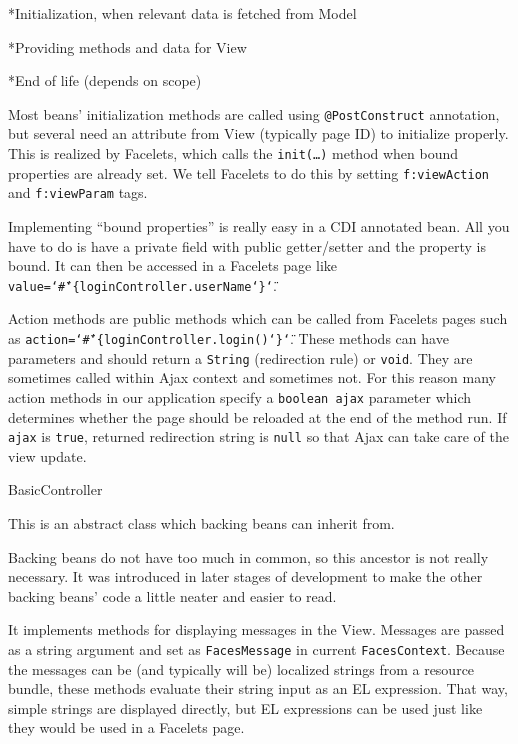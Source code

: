\begitems

*Initialization, when relevant data is fetched from Model

*Providing methods and data for View

*End of life (depends on scope)

\enditems

Most beans’ initialization methods are called using {\tt @PostConstruct} annotation, but several need an attribute from View (typically page ID) to initialize properly. This is realized by Facelets, which calls the {\tt init(…)} method when bound properties are already set. We tell Facelets to do this by setting {\tt f:viewAction} and {\tt f:viewParam} tags.

Implementing “bound properties” is really easy in a CDI annotated bean. All you have to do is have a private field with public getter/setter and the property is bound. It can then be accessed in a Facelets page like {\tt value=\char`\"\#\char`\{loginController.userName\char`\}\char`\"}.

Action methods are public methods which can be called from Facelets pages such as {\tt action=\char`\"\#\char`\{loginController.login()\char`\}\char`\"}. These methods can have parameters and should return a {\tt String} (redirection rule) or {\tt void}. They are sometimes called within Ajax context and sometimes not. For this reason many action methods in our application specify a {\tt boolean ajax} parameter which determines whether the page should be reloaded at the end of the method run. If {\tt ajax} is {\tt true}, returned redirection string is {\tt null} so that Ajax can take care of the view update.

\secc BasicController

This is an abstract class which backing beans can inherit from.

Backing beans do not have too much in common, so this ancestor is not really necessary. It was introduced in later stages of development to make the other backing beans’ code a little neater and easier to read.

It implements methods for displaying messages in the View. Messages are passed as a string argument and set as {\tt FacesMessage} in current {\tt FacesContext}. Because the messages can be (and typically will be) localized strings from a resource bundle, these methods evaluate their string input as an EL expression. That way, simple strings are displayed directly, but EL expressions can be used just like they would be used in a Facelets page.

